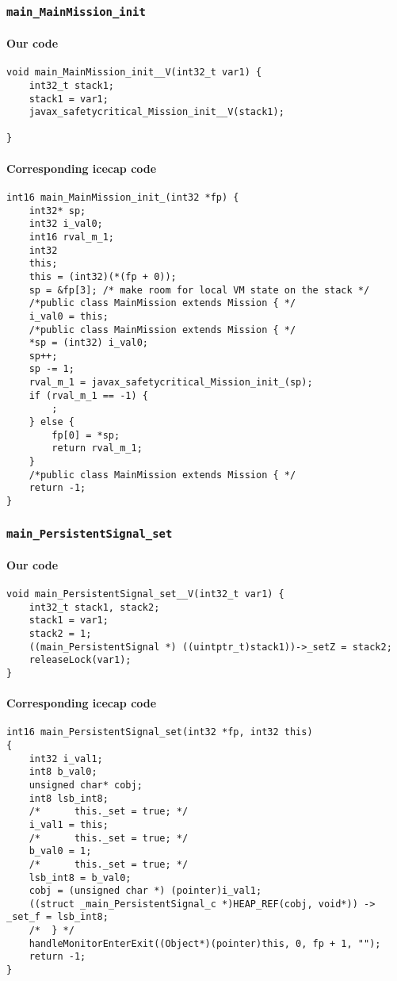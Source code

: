 \subsubsection{\texttt{main\_MainMission\_init}}

\paragraph{Our code}\hfill
\begin{lstlisting}[firstnumber=1749]
void main_MainMission_init__V(int32_t var1) {
	int32_t stack1;
	stack1 = var1;
	javax_safetycritical_Mission_init__V(stack1);

}
\end{lstlisting}

\paragraph{Corresponding icecap code}\hfill
\begin{lstlisting}[firstnumber=53918]
int16 main_MainMission_init_(int32 *fp) {
	int32* sp;
	int32 i_val0;
	int16 rval_m_1;
	int32
	this;
	this = (int32)(*(fp + 0));
	sp = &fp[3]; /* make room for local VM state on the stack */
	/*public class MainMission extends Mission { */
	i_val0 = this;
	/*public class MainMission extends Mission { */
	*sp = (int32) i_val0;
	sp++;
	sp -= 1;
	rval_m_1 = javax_safetycritical_Mission_init_(sp);
	if (rval_m_1 == -1) {
		;
	} else {
		fp[0] = *sp;
		return rval_m_1;
	}
	/*public class MainMission extends Mission { */
	return -1;
}
\end{lstlisting}

\subsubsection{\texttt{main\_PersistentSignal\_set}}

\paragraph{Our code}\hfill
\begin{lstlisting}[firstnumber=1811]
void main_PersistentSignal_set__V(int32_t var1) {
	int32_t stack1, stack2;
	stack1 = var1;
	stack2 = 1;
	((main_PersistentSignal *) ((uintptr_t)stack1))->_setZ = stack2;
	releaseLock(var1);
}
\end{lstlisting}

\paragraph{Corresponding icecap code}\hfill
\begin{lstlisting}[firstnumber=54627]
int16 main_PersistentSignal_set(int32 *fp, int32 this)
{
	int32 i_val1;
	int8 b_val0;
	unsigned char* cobj;
	int8 lsb_int8;
	/*		this._set = true; */
	i_val1 = this;
	/*		this._set = true; */
	b_val0 = 1;
	/*		this._set = true; */
	lsb_int8 = b_val0;
	cobj = (unsigned char *) (pointer)i_val1;
	((struct _main_PersistentSignal_c *)HEAP_REF(cobj, void*)) -> _set_f = lsb_int8;
	/*	} */
	handleMonitorEnterExit((Object*)(pointer)this, 0, fp + 1, "");
	return -1;
}
\end{lstlisting}

